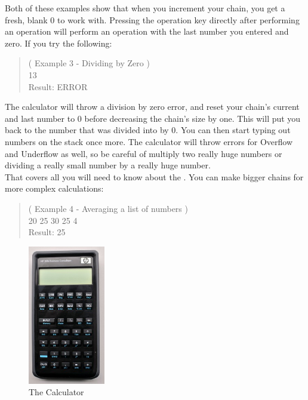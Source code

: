 \documentclass{LibHP20b}
\begin{document}
Both of these examples show that when you increment your \RPN{} chain, you get a fresh, blank 0 to work with. Pressing the operation key directly after performing an operation will perform an operation with the last number you entered and zero. If you try the following:\\
\begin{quote}
\center
( Example 3 - Dividing by Zero )\\
13  \HPButton{$\div$}\\
Result: ERROR\\
\end{quote}
The calculator will throw a division by zero error, and reset your \RPN{} chain's current and last number to 0 before decreasing the \RPN{} chain's size by one. This will put you back to the number that was divided into by 0. You can then start typing out numbers on the stack once more. The calculator will throw errors for Overflow and Underflow as well, so be careful of multiply two really huge numbers or dividing a really small number by a really huge number.\\
That covers all you will need to know about the \HP[]. You can make bigger \RPN{} chains for more complex calculations:\\
\begin{quote}
\center
( Example 4 - Averaging a list of numbers )\\
20  25  30  25 \HPButton{+}\HPButton{+}\HPButton{+} 4 \HPButton{$\div$}\\
Result: 25\\[3ex]
\end{quote}


\begin{figure}
\centerline{\includegraphics[width=0.3\textwidth]{HP20bCalculator.jpg}}
\caption{The \HP[hp] Calculator}
\label{fig:hp20b}
\end{figure}
\end{document}
